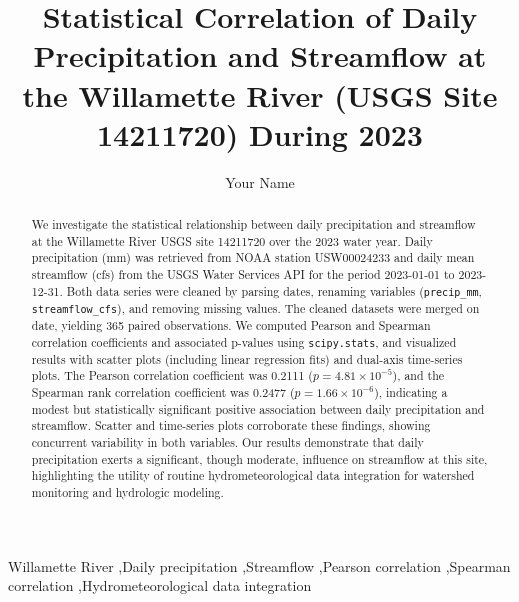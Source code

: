 \documentclass[preprint,12pt]{elsarticle}
\begin{document}
\begin{frontmatter}

\title{Statistical Correlation of Daily Precipitation and Streamflow at the Willamette River (USGS Site 14211720) During 2023}

\author[1]{Your Name}

\begin{abstract}
We investigate the statistical relationship between daily precipitation and streamflow at the Willamette River USGS site 14211720 over the 2023 water year. Daily precipitation (mm) was retrieved from NOAA station USW00024233 and daily mean streamflow (cfs) from the USGS Water Services API for the period 2023-01-01 to 2023-12-31. Both data series were cleaned by parsing dates, renaming variables (\texttt{precip\_mm}, \texttt{streamflow\_cfs}), and removing missing values. The cleaned datasets were merged on date, yielding 365 paired observations. We computed Pearson and Spearman correlation coefficients and associated p-values using \texttt{scipy.stats}, and visualized results with scatter plots (including linear regression fits) and dual-axis time-series plots. The Pearson correlation coefficient was 0.2111 ($p = 4.81\times10^{-5}$), and the Spearman rank correlation coefficient was 0.2477 ($p = 1.66\times10^{-6}$), indicating a modest but statistically significant positive association between daily precipitation and streamflow. Scatter and time-series plots corroborate these findings, showing concurrent variability in both variables. Our results demonstrate that daily precipitation exerts a significant, though moderate, influence on streamflow at this site, highlighting the utility of routine hydrometeorological data integration for watershed monitoring and hydrologic modeling.
\end{abstract}

\begin{keyword}
Willamette River \sep Daily precipitation \sep Streamflow \sep Pearson correlation \sep Spearman correlation \sep Hydrometeorological data integration
\end{keyword}

\end{frontmatter}

\end{document}
